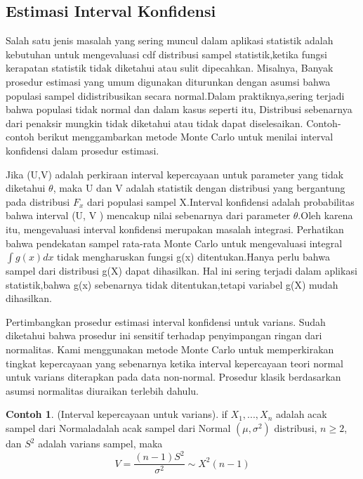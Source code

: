 \documentclass[a4paper,12pt]{article}
\theoremstyle{definition}
\newtheorem{example}{Contoh}[section]
\begin{document}
\subsection{Estimasi Interval Konfidensi}
Salah satu jenis masalah yang sering muncul dalam aplikasi statistik adalah kebutuhan untuk mengevaluasi cdf distribusi sampel statistik,ketika fungsi kerapatan statistik tidak diketahui atau sulit dipecahkan. Misalnya, Banyak prosedur estimasi yang umum digunakan diturunkan dengan asumsi bahwa populasi sampel didistribusikan secara normal.Dalam praktiknya,sering terjadi bahwa populasi tidak normal dan dalam kasus seperti itu, Distribusi sebenarnya dari penaksir mungkin tidak diketahui atau tidak dapat diselesaikan. Contoh-contoh berikut menggambarkan metode Monte Carlo untuk menilai interval konfidensi dalam prosedur estimasi.

Jika (U,V) adalah perkiraan interval kepercayaan untuk parameter yang tidak diketahui $\theta$, maka U dan V adalah statistik dengan distribusi yang bergantung pada distribusi $F_{x}$ dari populasi sampel X.Interval konfidensi adalah probabilitas bahwa interval (U, V ) mencakup nilai sebenarnya dari parameter $\theta$.Oleh karena itu, mengevaluasi interval konfidensi merupakan masalah integrasi.
Perhatikan bahwa pendekatan sampel rata-rata Monte Carlo untuk mengevaluasi integral $\int g(x)dx$ tidak mengharuskan fungsi g(x) ditentukan.Hanya perlu bahwa sampel dari distribusi g(X) dapat dihasilkan. Hal ini sering terjadi dalam aplikasi statistik,bahwa g(x) sebenarnya tidak ditentukan,tetapi variabel g(X) mudah dihasilkan.

Pertimbangkan prosedur estimasi interval konfidensi untuk varians. Sudah diketahui bahwa prosedur ini sensitif terhadap penyimpangan ringan dari normalitas. Kami menggunakan metode Monte Carlo untuk memperkirakan tingkat kepercayaan yang sebenarnya ketika interval kepercayaan teori normal untuk varians diterapkan pada data non-normal. Prosedur klasik berdasarkan asumsi normalitas diuraikan terlebih dahulu.

\begin{example}
    (Interval kepercayaan untuk varians). if $X_{1},...,X_{n}$ adalah acak sampel dari Normaladalah acak sampel dari Normal $\left ( \mu ,\sigma ^{2} \right )$ distribusi, $n\geq 2$, dan $S^{2}$ adalah varians sampel, maka
    \begin{equation*}
        V=\frac{(n-1)S^2}{\sigma ^2} \sim X^2(n-1)
    \end{equation*}
\end{example}
\end{document}
